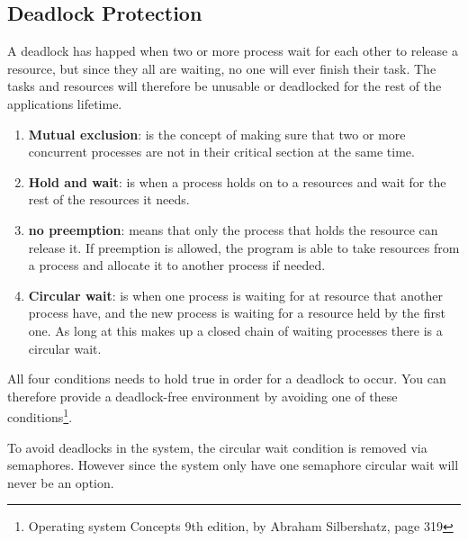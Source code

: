 \subsection{Deadlock Protection}
\label{sec:DeadlockProtection}

A deadlock has happed when two or more process wait for each other to release a resource, but since they all are waiting, no one will ever finish their task. The tasks and resources will therefore be unusable or deadlocked for the rest of the applications lifetime. 


\begin{enumerate}[noitemsep]
	
	\item \textbf{Mutual exclusion}: is the concept of making sure that two or more concurrent processes are not in their critical section at the same time. 
	
	\item \textbf{Hold and wait}: is when a process holds on to a resources and wait for the rest of the resources it needs.
	
	\item \textbf{no preemption}: means that only the process that holds the resource can release it. If preemption is allowed, the program is able to take resources from a process and allocate it to another process if needed.
	
	\item \textbf{Circular wait}: is when one process is waiting for at resource that another process have, and the new process is waiting for a resource held by the first one. As long at this makes up a closed chain of waiting processes there is a circular wait.

	
\end{enumerate}

All four conditions needs to hold true in order for a deadlock to occur. You can therefore provide a deadlock-free environment by avoiding one of these conditions\footnote{Operating system Concepts 9th edition, by Abraham Silbershatz, page 319}. 

To avoid deadlocks in the system, the circular wait condition is removed via semaphores. However since the system only have one semaphore circular wait will never be an option. 













